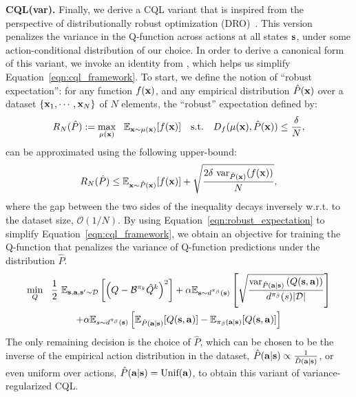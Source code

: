 \textbf{CQL(var).} Finally, we derive a CQL variant that is inspired from the perspective of distributionally robust optimization (DRO)~\citep{namkoong2017variance}. This version penalizes the variance in the Q-function across actions at all states $\mathbf{s}$, under some action-conditional distribution of our choice. In order to derive a canonical form of this variant, we invoke an identity from \citet{namkoong2017variance}, which helps us simplify Equation~\ref{eqn:cql_framework}. To start, we define the notion of ``robust expectation'': for any function $f(\mathbf{x})$, and any empirical distribution $\hat{P}(\mathbf{x})$ over a dataset $\{ \mathbf{x}_1, \cdots, \mathbf{x}_N\}$ of $N$ elements, the ``robust'' expectation defined by: 
\begin{equation*}
    R_N(\hat{P}) := \max_{\mu(\mathbf{x})} ~~\mathbb{E}_{\mathbf{x} \sim \mu(\mathbf{x})}[f(\mathbf{x})] \text{~~~s.t.~~~} D_{f}(\mu(\mathbf{x}), \hat{P}(\mathbf{x})) \leq \frac{\delta}{N},
\end{equation*}    
can be approximated using the following upper-bound:
\begin{equation}
    R_N(\hat{P}) \leq \mathbb{E}_{\mathbf{x} \sim \hat{P}(\mathbf{x})}[f(\mathbf{x})] + \sqrt{\frac{2 \delta~ \text{var}_{\hat{P}(\mathbf{x})}(f(\mathbf{x}))}{N}},
    \label{eqn:robust_expectation}
\end{equation}
where the gap between the two sides of the inequality decays inversely w.r.t. to the dataset size, $\mathcal{O}(1/N)$. By using Equation~\ref{eqn:robust_expectation} to simplify Equation~\ref{eqn:cql_framework}, we obtain an objective for training the Q-function that penalizes the variance of Q-function predictions under the distribution $\hat{P}$. 
\begin{multline}
    \min_{Q}~~ \frac{1}{2}~ \mathbb{E}_{\mathbf{s}, \mathbf{a}, \mathbf{s}' \sim \mathcal{D}}\left[\left(Q - \mathcal{B}^{\pi_k} \hat{Q}^{k} \right)^2 \right] + \alpha \mathbb{E}_{\mathbf{s} \sim d^{\pi_\beta}(\mathbf{s})}\left[\sqrt{\frac{\text{var}_{\hat{P}(\mathbf{a}|\mathbf{s})}\left( Q(\mathbf{s}, \mathbf{a}) \right)}{d^{\pi_\beta}(s) |\mathcal{D}|}} \right] \\ 
    + \alpha \mathbb{E}_{s \sim d^{\pi_\beta}(\mathbf{s})}\left[ \mathbb{E}_{\hat{P}(\mathbf{a}|\mathbf{s})}[Q(\mathbf{s}, \mathbf{a})] - \mathbb{E}_{{\pi_\beta}(\mathbf{a}|\mathbf{s})}[Q(\mathbf{s}, \mathbf{a})] \right]
    \label{eqn:variance_regularized_again}
\end{multline}
The only remaining decision is the choice of $\hat{P}$, which can be chosen to be the inverse of the empirical action distribution in the dataset, $\hat{P}(\mathbf{a}|\mathbf{s}) \propto \frac{1}{\hat{D}(\mathbf{a}|\mathbf{s})}$, or even uniform over actions, $\hat{P}(\mathbf{a}|\mathbf{s}) = \text{Unif}(\mathbf{a})$, to obtain this variant of variance-regularized CQL.


